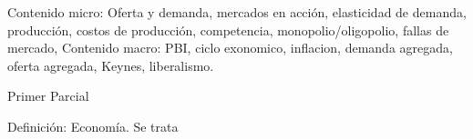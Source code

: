 \documentclass[,10pt]{article}
\begin{document}
	Contenido micro: Oferta y demanda, mercados en acción, elasticidad de demanda, producción, costos de producción, competencia, monopolio/oligopolio, fallas de mercado, 
	Contenido macro: PBI, ciclo exonomico, inflacion, demanda agregada, oferta agregada, Keynes, liberalismo.
	
	{Primer Parcial}
	
	Definición: Economía. Se trata 
\end{document}
